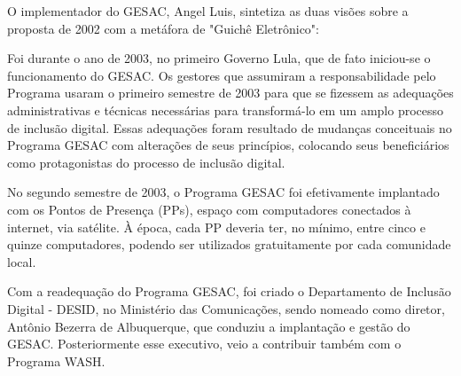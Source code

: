 O implementador do GESAC, Angel Luis, sintetiza as duas visões sobre a proposta de 2002 com a metáfora de "Guichê Eletrônico":


\noindent\begin{center}\mbox{\centering{}}\end{center}


Foi durante o ano de 2003, no primeiro Governo Lula, que de fato iniciou-se o funcionamento do  GESAC. Os gestores que assumiram a responsabilidade pelo Programa usaram o primeiro semestre de 2003 para que se fizessem as adequações administrativas e técnicas necessárias para transformá-lo em um amplo processo de inclusão digital. Essas adequações foram resultado de mudanças conceituais no Programa GESAC com alterações de seus princípios, colocando seus beneficiários como protagonistas do processo de inclusão digital.

No segundo semestre de 2003, o Programa GESAC foi efetivamente implantado com os Pontos de Presença (PPs), espaço com  computadores conectados à internet, via satélite. À época, cada PP deveria ter, no mínimo, entre cinco e quinze computadores, podendo ser utilizados gratuitamente por cada comunidade local.

Com a readequação do Programa GESAC, foi criado o Departamento de Inclusão Digital - DESID, no Ministério das Comunicações, sendo nomeado como diretor, Antônio Bezerra de Albuquerque, que conduziu a implantação e gestão do GESAC. Posteriormente esse executivo, veio a contribuir também com o Programa WASH.


\noindent\begin{center}\mbox{\centering{}}\end{center}


